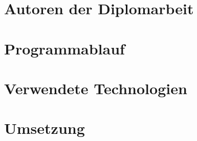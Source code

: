 \documentclass[11pt]{report}
\begin{document}
\layout
\part{Autoren der Diplomarbeit}  

\tableofcontents


\part{Programmablauf}
\part{Verwendete Technologien}\label{part:Verwendete Technologien}







\part{Umsetzung}



\printbibliography

\listoffigures
%

%
% 
\end{document}
